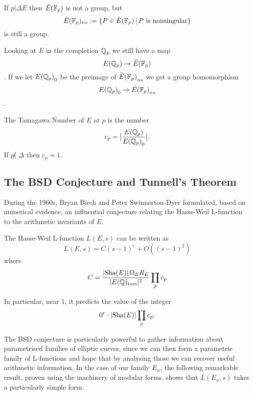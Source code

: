 \documentclass[12pt, a4paper]{amsart}
\begin{document}
If $p | \Delta E$ then $\tilde{E}(\mathbb{F}_p)$ is not a group, but
\[
  \tilde{E}(\mathbb{F}_p)_{ns} := \{P \in \tilde{E}(\mathbb{F}_p) \,|\, P \text{ is nonsingular}\}
  \]
is still a group.

Looking at $E$ in the completion ${\mathbb Q}_p$ we still have a map
\[{E({\mathbb Q}_p)} \rightarrow {\tilde{E}(\mathbb{F}_p)}\].
If we let ${E({\mathbb Q}_p)}_0$ be the preimage of ${\tilde{E}(\mathbb{F}_p)}_{ns}$ we get a group homomorphism
\[ {E({\mathbb Q}_p)}_0 \rightarrow {\tilde{E}(\mathbb{F}_p)}_{ns} \].

\begin{defn}
  The Tamagawa Number of $E$ at $p$ is the number
  $$c_p = \big| \frac{{E({\mathbb Q}_p)}}{{E({\mathbb Q}_p)}_0}
  \big|.$$
  If $p \not| \,\, \Delta$ then $c_p = 1$.
\end{defn}  
  
\subsection{The BSD Conjecture and Tunnell's Theorem}

During the 1960s, Bryan Birch and Peter Swinnerton-Dyer formulated, based
on numerical evidence, an influential conjecture relating the Hasse-Weil
L-function to the arithmetic invariants of $E$.

\begin{conj}
  The Hasse-Weil L-function $L(E,s)$ can be written as
  \[L(E,s) = C (s-1)^r + O((s-1)^2)\] where
  \[C = \frac{|\text{Sha}(E)| \, \Omega_E R_E}{|E({\mathbb Q})_{\text{tors}}|^2} \prod_p c_p\]
\end{conj}

In particular, near 1, it predicts the value of the integer
\[0^r \cdot | \text{Sha}(E)| \prod_p c_p .\]

The BSD conjecture is particularly powerful to gather information about
parametrised families of elliptic curves, since we can then form a parametric
family of L-functions and hope that by analysing those we can recover useful
arithmetic information.
In the case of our family $E_n$, the following remarkable result, proven using
the machinery of modular forms, shows that
$L(E_n,s)$ takes a particularly simple form.
\end{document}
